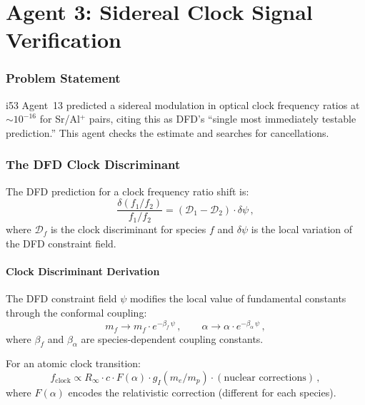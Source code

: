 \documentclass[11pt,a4paper]{article}
\begin{document}
\part{Agent 3: Sidereal Clock Signal Verification}
\label{part:clock}

\section{Problem Statement}

i53 Agent~13 predicted a sidereal modulation in optical clock frequency ratios at $\sim 10^{-16}$ for Sr/Al$^+$ pairs, citing this as DFD's ``single most immediately testable prediction.'' This agent checks the estimate and searches for cancellations.

\section{The DFD Clock Discriminant}

The DFD prediction for a clock frequency ratio shift is:
\begin{equation}
\frac{\delta(f_1/f_2)}{f_1/f_2} = (\mathcal{D}_1 - \mathcal{D}_2) \cdot \delta\psi\,,
\end{equation}
where $\mathcal{D}_f$ is the clock discriminant for species $f$ and $\delta\psi$ is the local variation of the DFD constraint field.

\subsection{Clock Discriminant Derivation}

The DFD constraint field $\psi$ modifies the local value of fundamental constants through the conformal coupling:
\begin{equation}
m_f \to m_f \cdot e^{-\beta_f\,\psi}\,,\qquad \alpha \to \alpha \cdot e^{-\beta_\alpha\,\psi}\,,
\end{equation}
where $\beta_f$ and $\beta_\alpha$ are species-dependent coupling constants.

For an atomic clock transition:
\begin{equation}
f_{\mathrm{clock}} \propto R_\infty \cdot c \cdot F(\alpha) \cdot g_I(m_e/m_p) \cdot (\text{nuclear corrections})\,,
\end{equation}
where $F(\alpha)$ encodes the relativistic correction (different for each species).
\end{document}

